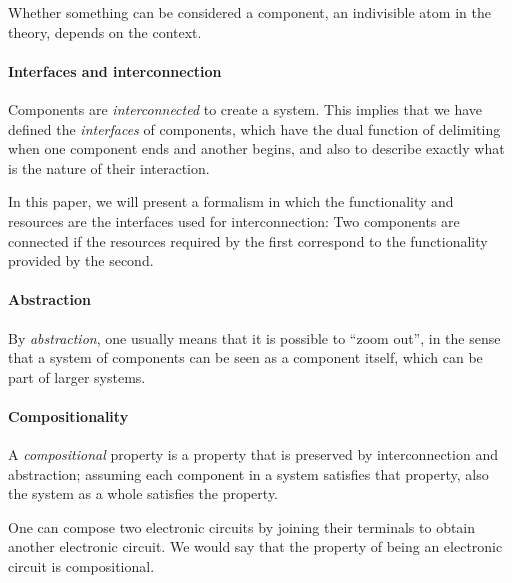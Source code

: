 Whether something can be considered a component, an indivisible atom in the theory, depends on the context.
%


\paragraph{Interfaces and interconnection}

Components are \emph{interconnected} to create a system.
This implies that we have defined the \emph{interfaces} of components, which
have the dual function of delimiting when one component ends and another begins,
and also to describe exactly what is the nature of their interaction.

In this paper, we will present a formalism in which the functionality and resources
are the interfaces used for interconnection: Two components are connected
if the resources required by the first correspond to the functionality
provided by the second.




\paragraph{Abstraction}

By \emph{abstraction}, one usually means that it is possible to ``zoom out'',
in the sense that a system of components can be seen as a component itself,
which can be part of larger systems.



\paragraph{Compositionality}

A \emph{compositional} property is a property that is preserved by interconnection and abstraction; assuming each component in a system satisfies that property, also the system as a whole satisfies the property.

\begin{example}
One can compose two electronic circuits by joining their terminals to obtain
another electronic circuit. We would say that the property
of being an electronic circuit is compositional.
\end{example}

